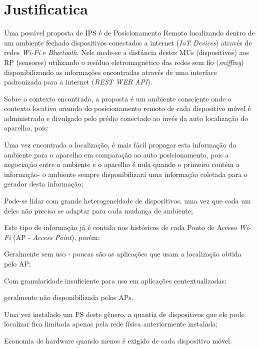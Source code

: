 \section{Justificatica}
\label{sec:Justificatica}

Uma possível proposta de IPS é de Posicionamento Remoto localizando dentro de um
ambiente fechado dispositivos conectados a internet (\emph{IoT Devices})
através de redes \emph{Wi-Fi} e \emph{Bluetooth}. Nele mede-se a distância
destes MUs (dispositivos) aos RP (sensores) utilizando o resíduo eletromagnético
das redes sem fio (\emph{sniffing}) disponibilizando as informações
encontradas através de uma interface padronizada para a internet (\emph{REST
WEB API}).

Sobre o contexto encontrado, a proposta é um ambiente consciente onde o contexto
locativo oriundo do posicionamento remoto de cada dispositivo móvel é
administrado e divulgado pelo prédio conectado ao invés da auto localização do
aparelho, pois:

\begin{alineas}

	\item Uma vez encontrada a localização, é mais fácil propagar esta informação do
ambiente para o aparelho em comparação ao auto posicionamento, pois a negociação
entre o ambiente e o aparelho é nula quando o primeiro contém a informação- o
ambiente sempre disponibilizará uma informação coletada para o gerador desta
informação;

	\item Pode-se lidar com grande heterogeneidade de dispositivos, uma vez
que cada um deles não precisa se adaptar para cada mudança de ambiente;

	\item Este tipo de informação já é contida nos históricos de cada Ponto de
	Acesso \emph{Wi-Fi} (AP - \emph{Access Point}), porém:

	\begin{alineas}

		\item Geralmente sem uso - poucas são as aplicações que usam a
		localização obtida pelo AP;

		\item Com granularidade insuficiente para uso em aplicações
		contextualizadas;

		\item geralmente não disponibilizada pelos APs.

	\end{alineas}

	\item Uma vez instalado um PS deste gênero, a quantia de dispositivos que
	ele pode localizar fica limitada apenas pela rede física anteriormente
	instalada;

	\item Economia de hardware quando menos é exigido de cada dispositivo móvel.

\end{alineas}

